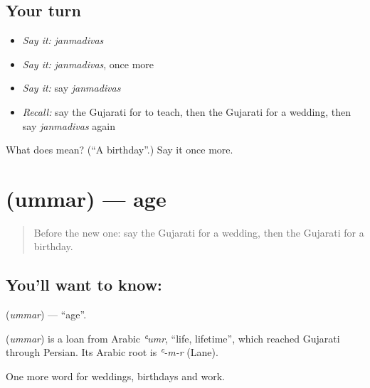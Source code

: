 \subsection*{Your turn}
\begin{itemize}
\raggedright
  \item \emph{Say it:} \emph{janmadivas}
  \item \emph{Say it:} \emph{janmadivas}, once more
  \item \emph{Say it:} say \emph{janmadivas}
  \item \emph{Recall:} say the Gujarati for to teach, then the Gujarati for a wedding, then say \emph{janmadivas} again
\end{itemize}

\begin{tcolorbox}[breakable,colback=teal!4,colframe=teal!35!black,title={Before you move on}]
What does  mean? (\textquotedblleft{}A birthday\textquotedblright{}.) Say it once more.
\end{tcolorbox}
\section[\texorpdfstring{\gu{ઉંમર} (ummar)}{ઉંમર (ummar)}]{ (ummar) — age}

\label{lesson:GU-C90-age}



\begin{quote}
Before the new one: say the Gujarati for a wedding, then the Gujarati for a birthday.
\end{quote}

\subsection*{You'll want to know: }
\textbf{} (\emph{ummar}) — \textquotedblleft{}age\textquotedblright{}.

\begin{cousinweb}
\textbf{} (\emph{ummar}) is a loan from Arabic \emph{ʿumr}, \textquotedblleft{}life, lifetime\textquotedblright{}, which reached Gujarati through Persian. Its Arabic root is \emph{ʿ-m-r} (Lane).
\end{cousinweb}

\begin{grammarlens}[title={What you've built}]
One more word for weddings, birthdays and work.
\end{grammarlens}

